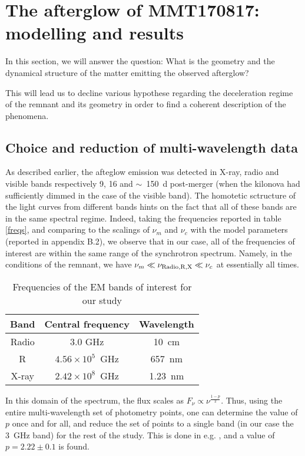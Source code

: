 \section{The afterglow of MMT170817: modelling and results}

In this section, we will answer the question: What is the geometry and the dynamical structure of the matter emitting the observed afterglow?

This will lead us to decline various hypothese regarding the deceleration regime of the remnant and its geometry in order to find a coherent description of the phenomena.

\subsection{Choice and reduction of multi-wavelength data}
As described earlier, the afteglow emission was detected in X-ray, radio and visible bands respectively 9, 16 and $\sim$~150~d post-merger (when the kilonova had sufficiently dimmed in the case of the visible band). The homotetic sctructure of the light curves from different bands hints on the fact that all of these bands are in the same spectral regime. Indeed, taking the frequencies reported in table \ref{freqs}, and comparing to the scalings of $\nu_m$ and $\nu_c$ with the model parameters (reported in appendix B.2), we observe that in our case, all of the frequencies of interest are within the same range of the synchrotron spectrum. Namely, in the conditions of the remnant, we have $\nu_m \ll \nu_{\rm{Radio, R, X}} \ll \nu_c$ at essentially all times.

\begin{table}
\begin{center}
\begin{tabular}{c|c|c}
\bf{Band} & \bf{Central frequency} & \bf{Wavelength}\\
\hline
Radio & 3.0 GHz & 10~cm\\
R & $4.56\times 10^5$~GHz & 657~nm \\
X-ray & $2.42\times 10^8$~GHz & 1.23~nm \\

\end{tabular}
\caption{Frequencies of the EM bands of interest for our study}
\label{freq}
\end{center}
\end{table}

In this domain of the spectrum, the flux scales as $F_\nu \propto \nu^{\frac{1 - p}{2}}$. Thus, using the entire multi-wavelength set of photometry points, one can determine the value of $p$ once and for all, and reduce the set of points to a single band (in our case the 3~GHz band) for the rest of the study. This is done in e.g. \cite{5}, and a value of $p = 2.22\pm0.1$ is found.

